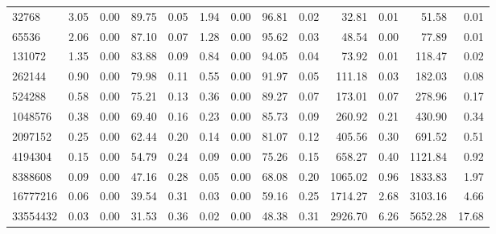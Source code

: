 \begin{tabular}{lrrrrrrrrrrrr}
32768      &        3.05 &        0.00 &         89.75 &          0.05 &           1.94 &           0.00 &        96.81 &         0.02 &            32.81 &             0.01 &           51.58 &            0.01 \\
65536      &        2.06 &        0.00 &         87.10 &          0.07 &           1.28 &           0.00 &        95.62 &         0.03 &            48.54 &             0.00 &           77.89 &            0.01 \\
131072     &        1.35 &        0.00 &         83.88 &          0.09 &           0.84 &           0.00 &        94.05 &         0.04 &            73.92 &             0.01 &          118.47 &            0.02 \\
262144     &        0.90 &        0.00 &         79.98 &          0.11 &           0.55 &           0.00 &        91.97 &         0.05 &           111.18 &             0.03 &          182.03 &            0.08 \\
524288     &        0.58 &        0.00 &         75.21 &          0.13 &           0.36 &           0.00 &        89.27 &         0.07 &           173.01 &             0.07 &          278.96 &            0.17 \\
1048576    &        0.38 &        0.00 &         69.40 &          0.16 &           0.23 &           0.00 &        85.73 &         0.09 &           260.92 &             0.21 &          430.90 &            0.34 \\
2097152    &        0.25 &        0.00 &         62.44 &          0.20 &           0.14 &           0.00 &        81.07 &         0.12 &           405.56 &             0.30 &          691.52 &            0.51 \\
4194304    &        0.15 &        0.00 &         54.79 &          0.24 &           0.09 &           0.00 &        75.26 &         0.15 &           658.27 &             0.40 &         1121.84 &            0.92 \\
8388608    &        0.09 &        0.00 &         47.16 &          0.28 &           0.05 &           0.00 &        68.08 &         0.20 &          1065.02 &             0.96 &         1833.83 &            1.97 \\
16777216   &        0.06 &        0.00 &         39.54 &          0.31 &           0.03 &           0.00 &        59.16 &         0.25 &          1714.27 &             2.68 &         3103.16 &            4.66 \\
33554432   &        0.03 &        0.00 &         31.53 &          0.36 &           0.02 &           0.00 &        48.38 &         0.31 &          2926.70 &             6.26 &         5652.28 &           17.68 \\

\end{tabular}
